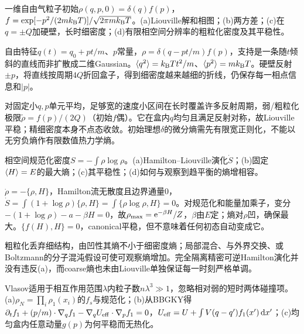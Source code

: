 \begin{exercise}[原题1(a)--(d)]\label{r:333-2-1}
一维自由气粒子初始$\rho(q,p,0)=\delta(q)f(p)$，$f=\exp[-p^2/(2mk_{\mathrm B} T)]/\sqrt{2\pi mk_{\mathrm B} T}$。(a)Liouville解和相图；(b)两方差；(c)在$q=\pm Q$加硬壁，长时细密度；(d)有限相空间分辨率的粗粒化密度及其平稳性。
\end{exercise}
\begin{solution}
自由特征$q(t)=q_0+pt/m$、$p$常量，$\rho=\delta(q-pt/m)f(p)$，支持是一条随$t$倾斜的直线而非扩散成二维Gaussian。$\langle q^2\rangle=k_{\mathrm B} Tt^2/m$、$\langle p^2\rangle=mk_{\mathrm B} T$。硬壁反射$\pm p$，将直线按周期$4Q$折回盒子，得到细密度越来越细的折线，仍保存每一相点信息和$|p|$。

对固定小$q,p$单元平均，足够宽的速度小区间在长时覆盖许多反射周期，弱/粗粒化极限$\widetilde\rho=f(p)/(2Q)$（初始$f$偶）。它在盒内$q$均匀且满足反射对称，故Liouville平稳；精细密度本身不点态收敛。初始理想$\delta$的微分熵需先有限宽正则化，不能以无穷负熵作有限数值热力学熵。
\end{solution}
\begin{exercise}[原题2(a)--(d)]\label{r:333-2-2}
相空间规范化密度$S=-\int\rho\log\rho$。(a)Hamilton--Liouville演化$\dot S$；(b)固定$\langle H\rangle=E$的最大熵；(c)其平稳性；(d)如何与观察到趋平衡的熵增相容。
\end{exercise}
\begin{solution}
$\dot\rho=-\{\rho,H\}$，Hamilton流无散度且边界通量0，$\dot S=\int(1+\log\rho)\{\rho,H\}=\int\{\rho\log\rho,H\}=0$。对规范化和能量加乘子，变分$-(1+\log\rho)-a-\beta H=0$，故$\rho_{\max}=\mathrm e^{-\beta H}/Z$，$\beta$由$E$定；熵对$\rho$凹，确保最大。$\{f(H),H\}=0$，canonical平稳，但不意味着任何初态自动变成它。

粗粒化丢弃细结构，由凹性其熵不小于细密度熵；局部混合、与外界交换、或Boltzmann的分子混沌假设可使可观察熵增加。完全隔离精密可逆Hamilton演化并没有违反(a)，而coarse熵也未由Liouville单独保证每一时刻严格单调。
\end{solution}
\begin{exercise}[原题3(a)--(c)]\label{r:333-2-3}
Vlasov适用于相互作用范围$\lambda$内粒子数$n\lambda^3\gg1$，忽略相对弱的短时两体碰撞项。(a)$\rho_N=\prod_i\rho_1(x_i)$的$f_s$与规范化；(b)从BBGKY得$\partial_tf_1+(p/m)\cdot\nabla_qf_1-\nabla_qU_{\rm eff}\cdot\nabla_pf_1=0$，$U_{\rm eff}=U+\int V(q-q')f_1(x')\,\mathrm d x'$；(c)均匀盒内任意动量$g(p)$为何平稳而无热化。
\end{exercise}
